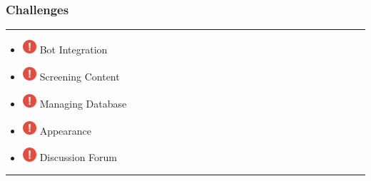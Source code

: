 \documentclass[14pt]{beamer}
\begin{document}
\begin{frame}
    \frametitle{Challenges}
    \noindent
    {\color{pink} \rule{\linewidth}{0.7mm} }
    \begin{itemize}
    \item [] \includegraphics[width=0.2in, height=0.2in]{./logos/exclamation.png} Bot Integration\\
        \pause
    \item [] \includegraphics[width=0.2in, height=0.2in]{./logos/exclamation.png} Screening Content\\
        \pause
    \item [] \includegraphics[width=0.2in, height=0.2in]{./logos/exclamation.png} Managing Database\\
        \pause
    \item [] \includegraphics[width=0.2in, height=0.2in]{./logos/exclamation.png} Appearance\\
        \pause
    \item [] \includegraphics[width=0.2in, height=0.2in]{./logos/exclamation.png} Discussion Forum\\
\end{itemize}
\noindent
    {\color{pink} \rule{\linewidth}{0.7mm} }
\end{frame}
\end{document}
